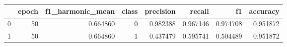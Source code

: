 \begin{tabular}{lrrrrrrr}
\toprule
 & epoch & f1_harmonic_mean & class & precision & recall & f1 & accuracy \\
\midrule
0 & 50 & 0.664860 & 0 & 0.982388 & 0.967146 & 0.974708 & 0.951872 \\
1 & 50 & 0.664860 & 1 & 0.437479 & 0.595741 & 0.504489 & 0.951872 \\
\bottomrule
\end{tabular}
